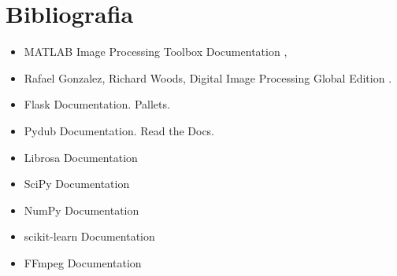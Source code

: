\section{Bibliografia}
\begin{itemize}
    \item MATLAB Image Processing Toolbox Documentation \cite{mathworks},
    \item Rafael Gonzalez, Richard Woods, Digital Image Processing Global Edition \cite{gonzalez2017}.
    \item Flask Documentation. Pallets.  \cite{flask_docs}
    \item Pydub Documentation. Read the Docs.  \cite{pydub_docs}
    \item Librosa Documentation  \cite{librosa_docs}
    \item SciPy Documentation  \cite{scipy_docs}
    \item NumPy Documentation \cite{numpy_docs}
    \item scikit-learn Documentation  \cite{scikitlearn_docs}
    \item FFmpeg Documentation  \cite{ffmpeg_docs}
    
\end{itemize}
